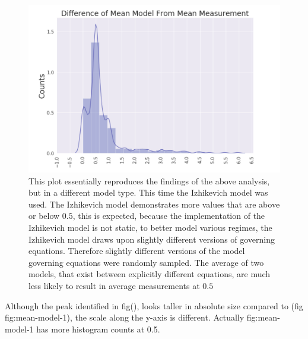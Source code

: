 \begin{figure}
    \centering
    \includegraphics{figures/reproduced_izhi.png}
    \caption[100 pairs of randomly sampled Izhikevich models: mean model mean parameter difference]{This plot essentially reproduces the findings of the above analysis, but in a different model type. This time the Izhikevich model was used. The Izhikevich model demonstrates more values that are above or below $0.5$, this is expected, because the implementation of the Izhikevich model is not static, to better model various regimes, the Izhikevich model draws upon slightly different versions of governing equations. Therefore slightly different versions of the model governing equations were randomly sampled. The average of two models, that exist between explicitly different equations, are much less likely to result in average measurements at $0.5$}
    \label{fig:mean-model-2}
\end{figure}

Although the peak identified in fig(\label{fig:mean-model-2}), looks taller in absolute size compared to (fig {fig:mean-model-1}), the scale along the y-axis is different. Actually {fig:mean-model-1} has more histogram counts at 0.5.




